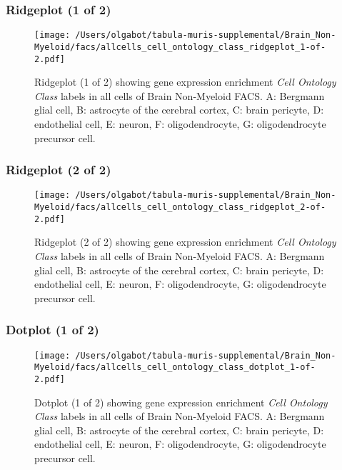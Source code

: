 \clearpage

\subsubsection{Ridgeplot (1 of 2)}
\begin{figure}[h]
\centering
\texttt{[image: /Users/olgabot/tabula-muris-supplemental/Brain\_Non-Myeloid/facs/allcells\_cell\_ontology\_class\_ridgeplot\_1-of-2.pdf]}

\caption{ Ridgeplot (1 of 2)  showing gene expression enrichment \emph{Cell Ontology Class} labels in all cells of Brain Non-Myeloid FACS. A: Bergmann glial cell, B: astrocyte of the cerebral cortex, C: brain pericyte, D: endothelial cell, E: neuron, F: oligodendrocyte, G: oligodendrocyte precursor cell.}
\end{figure}


\clearpage

\subsubsection{Ridgeplot (2 of 2)}
\begin{figure}[h]
\centering
\texttt{[image: /Users/olgabot/tabula-muris-supplemental/Brain\_Non-Myeloid/facs/allcells\_cell\_ontology\_class\_ridgeplot\_2-of-2.pdf]}

\caption{ Ridgeplot (2 of 2)  showing gene expression enrichment \emph{Cell Ontology Class} labels in all cells of Brain Non-Myeloid FACS. A: Bergmann glial cell, B: astrocyte of the cerebral cortex, C: brain pericyte, D: endothelial cell, E: neuron, F: oligodendrocyte, G: oligodendrocyte precursor cell.}
\end{figure}


\clearpage

\subsubsection{Dotplot (1 of 2)}
\begin{figure}[h]
\centering
\texttt{[image: /Users/olgabot/tabula-muris-supplemental/Brain\_Non-Myeloid/facs/allcells\_cell\_ontology\_class\_dotplot\_1-of-2.pdf]}

\caption{ Dotplot (1 of 2)  showing gene expression enrichment \emph{Cell Ontology Class} labels in all cells of Brain Non-Myeloid FACS. A: Bergmann glial cell, B: astrocyte of the cerebral cortex, C: brain pericyte, D: endothelial cell, E: neuron, F: oligodendrocyte, G: oligodendrocyte precursor cell.}
\end{figure}


